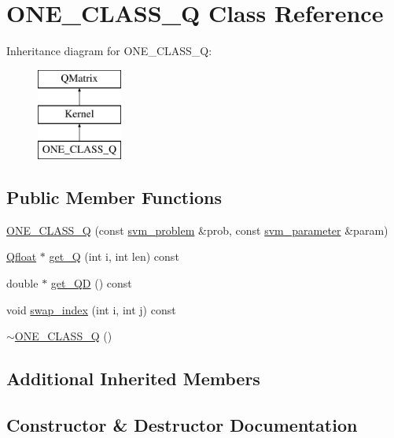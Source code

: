 \hypertarget{classONE__CLASS__Q}{}\section{O\+N\+E\+\_\+\+C\+L\+A\+S\+S\+\_\+Q Class Reference}
\label{classONE__CLASS__Q}
Inheritance diagram for O\+N\+E\+\_\+\+C\+L\+A\+S\+S\+\_\+Q\+:\begin{figure}[H]
\begin{center}
\leavevmode
\includegraphics[height=3.000000cm]{classONE__CLASS__Q}
\end{center}
\end{figure}
\subsection*{Public Member Functions}
\begin{DoxyCompactItemize}
\item 
\hyperlink{classONE__CLASS__Q_a759ec4e3e00887ed848cf3f79ab7065f}{O\+N\+E\+\_\+\+C\+L\+A\+S\+S\+\_\+Q} (const \hyperlink{structsvm__problem}{svm\+\_\+problem} \&prob, const \hyperlink{structsvm__parameter}{svm\+\_\+parameter} \&param)
\item 
\hyperlink{svm__core_8cpp_a8755d90a54ecfb8d15051af3e0542592}{Qfloat} $\ast$ \hyperlink{classONE__CLASS__Q_a1f8501234022e017cf46c4dfb2da9d31}{get\+\_\+Q} (int i, int len) const 
\item 
double $\ast$ \hyperlink{classONE__CLASS__Q_a882480d4370d8a89d667a28c3ed68a73}{get\+\_\+\+QD} () const 
\item 
void \hyperlink{classONE__CLASS__Q_ad8bc86ca742c27d82718346388f83fad}{swap\+\_\+index} (int i, int j) const 
\item 
\hyperlink{classONE__CLASS__Q_a569ea8969478398736d70eacc84edbad}{$\sim$\+O\+N\+E\+\_\+\+C\+L\+A\+S\+S\+\_\+Q} ()
\end{DoxyCompactItemize}
\subsection*{Additional Inherited Members}


\subsection{Constructor \& Destructor Documentation}
